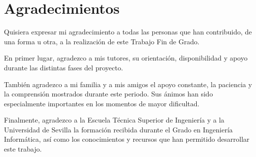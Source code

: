 \chapter*{Agradecimientos}

 Quisiera expresar mi agradecimiento a todas las personas que han contribuido, de una forma u otra, a la realización
  de este Trabajo Fin de Grado.

  En primer lugar, agradezco a mis tutores, su orientación, disponibilidad y apoyo durante las
  distintas fases del proyecto.

  También agradezco a mi familia y a mis amigos el apoyo constante, la paciencia y la comprensión mostrados durante
  este periodo. Sus ánimos han sido especialmente importantes en los momentos de mayor dificultad.

  Finalmente, agradezco a la Escuela Técnica Superior de Ingeniería y a la Universidad de Sevilla la formación
  recibida durante el Grado en Ingeniería Informática, así como los conocimientos y recursos que han permitido
  desarrollar este trabajo.